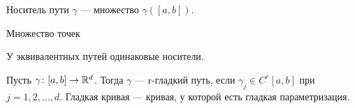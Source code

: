   \begin{conj}
    Носитель пути $\gamma$ --- множество $\gamma([a, b])$.
  \end{conj}

  Множество точек 
  
  \begin{notice}
    У эквивалентных путей одинаковые носители.
  \end{notice}
  
  \begin{conj}
    Пусть $\gamma\colon [a, b] \to \mathbb{R}^d$. Тогда $\gamma$ --- r-гладкий путь, если $\gamma_j \in C^r[a, b]$ при $j = 1, 2, \dotsc, d$.
    Гладкая кривая --- кривая, у которой есть гладкая параметризация.
  \end{conj}
  